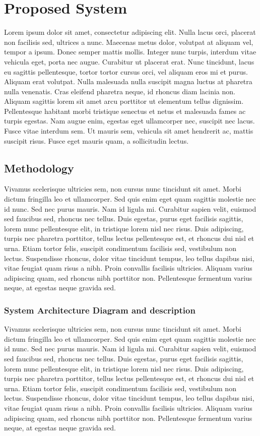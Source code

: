 \documentclass[12pt,a4paper,titlepage]{report}
\begin{document}
\chapter{Proposed System}
Lorem ipsum dolor sit amet, consectetur adipiscing elit. Nulla lacus orci, placerat non facilisis sed, ultrices a nunc. Maecenas metus dolor, volutpat at aliquam vel, tempor a ipsum. Donec semper mattis mollis. Integer nunc turpis, interdum vitae vehicula eget, porta nec augue. Curabitur ut placerat erat. Nunc tincidunt, lacus eu sagittis pellentesque, tortor tortor cursus orci, vel aliquam eros mi et purus. Aliquam erat volutpat. Nulla malesuada nulla suscipit magna luctus at pharetra nulla venenatis. Cras eleifend pharetra neque, id rhoncus diam lacinia non. Aliquam sagittis lorem sit amet arcu porttitor ut elementum tellus dignissim. Pellentesque habitant morbi tristique senectus et netus et malesuada fames ac turpis egestas. Nam augue enim, egestas eget ullamcorper nec, suscipit nec lacus. Fusce vitae interdum sem. Ut mauris sem, vehicula sit amet hendrerit ac, mattis suscipit risus. Fusce eget mauris quam, a sollicitudin lectus.

\section{Methodology}
Vivamus scelerisque ultricies sem, non cursus nunc tincidunt sit amet. Morbi dictum fringilla leo et ullamcorper. Sed quis enim eget quam sagittis molestie nec id nunc. Sed nec purus mauris. Nam id ligula mi. Curabitur sapien velit, euismod sed faucibus sed, rhoncus nec tellus. Duis egestas, purus eget facilisis sagittis, lorem nunc pellentesque elit, in tristique lorem nisl nec risus. Duis adipiscing, turpis nec pharetra porttitor, tellus lectus pellentesque est, et rhoncus dui nisl et urna. Etiam tortor felis, suscipit condimentum facilisis sed, vestibulum non lectus. Suspendisse rhoncus, dolor vitae tincidunt tempus, leo tellus dapibus nisi, vitae feugiat quam risus a nibh. Proin convallis facilisis ultricies. Aliquam varius adipiscing quam, sed rhoncus nibh porttitor non. Pellentesque fermentum varius neque, at egestas neque gravida sed.

\subsection{System Architecture Diagram and description }
Vivamus scelerisque ultricies sem, non cursus nunc tincidunt sit amet. Morbi dictum fringilla leo et ullamcorper. Sed quis enim eget quam sagittis molestie nec id nunc. Sed nec purus mauris. Nam id ligula mi. Curabitur sapien velit, euismod sed faucibus sed, rhoncus nec tellus. Duis egestas, purus eget facilisis sagittis, lorem nunc pellentesque elit, in tristique lorem nisl nec risus. Duis adipiscing, turpis nec pharetra porttitor, tellus lectus pellentesque est, et rhoncus dui nisl et urna. Etiam tortor felis, suscipit condimentum facilisis sed, vestibulum non lectus. Suspendisse rhoncus, dolor vitae tincidunt tempus, leo tellus dapibus nisi, vitae feugiat quam risus a nibh. Proin convallis facilisis ultricies. Aliquam varius adipiscing quam, sed rhoncus nibh porttitor non. Pellentesque fermentum varius neque, at egestas neque gravida sed.
\end{document}
